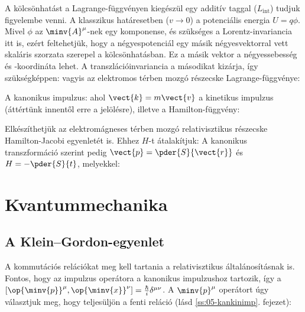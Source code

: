    A kölcsönhatást a Lagrange-függvényen kiegészül egy additív taggal ($L_\text{int}$) tudjuk figyelembe venni.
   A klasszikus határesetben ($v\to 0$) a potenciális energia $U=q\phi$.
   Mivel $\phi$ az $\minv{A}^\mu$-nek egy komponense, és szükséges a Lorentz-invariancia itt is, ezért feltehetjük, hogy a négyespotenciál egy másik négyesvektorral vett skaláris szorzata szerepel a kölcsönhatásban.
   Ez a másik vektor a négyessebesség és -koordináta lehet.
   A transzlációinvariancia a másodikat kizárja, így szükségképpen:
   vagyis az elektromos térben mozgó részecske Lagrange-függvénye:
   
   A kanonikus impulzus:
   ahol $\vect{k}=m\vect{v}$ a kinetikus impulzus (áttértünk innentől erre a jelölésre), illetve a Hamilton-függvény:
   
   Elkészíthetjük az elektromágneses térben mozgó relativisztikus részecske Hamilton-Jacobi egyenletét is.
   Ehhez $H$-t átalakítjuk:
   A kanonikus transzformáció szerint pedig $\vect{p}=\pder{S}{\vect{r}}$ és $H=-\pder{S}{t}$, melyekkel:
   
 \section{Kvantummechanika}\label{ss:02-kvantum}
   
  \subsection{A Klein--Gordon-egyenlet}
   
   A kommutációs relációkat meg kell tartania a relativisztikus általánosításnak is.
   Fontos, hogy az impulzus operátora a kanonikus impulzushoz tartozik, így a $[\op{\minv{p}}^\mu,\op{\minv{x}}^\nu]=\frac{\hbar}{i}\delta^{\mu\nu}$.
   A $\minv{p}^\mu$ operátort úgy választjuk meg, hogy teljesüljön a fenti reláció (lásd \ref{ss:05-kankinimp}. fejezet):
   
